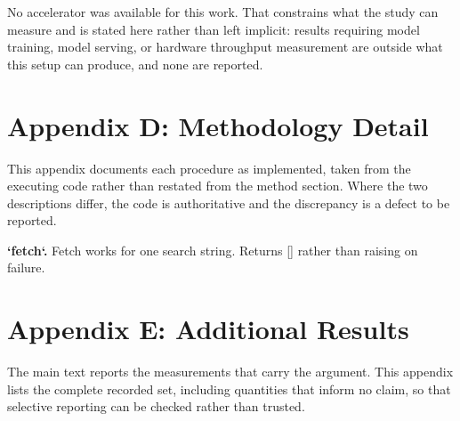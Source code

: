 \documentclass[10pt,journal,compsoc,twocolumn]{IEEEtran}
\begin{document}
No accelerator was available for this work. That constrains what the study can measure and is stated here rather than left implicit: results requiring model training, model serving, or hardware throughput measurement are outside what this setup can produce, and none are reported.




\section{Appendix D: Methodology Detail}


This appendix documents each procedure as implemented, taken from the executing code rather than restated from the method section. Where the two descriptions differ, the code is authoritative and the discrepancy is a defect to be reported.

\textbf{`fetch`.} Fetch works for one search string. Returns [] rather than raising on failure.




\section{Appendix E: Additional Results}


The main text reports the measurements that carry the argument. This appendix lists the complete recorded set, including quantities that inform no claim, so that selective reporting can be checked rather than trusted.
\begin{table}[htbp]
\centering
{}
\end{table}
\end{document}
